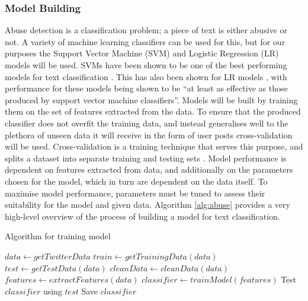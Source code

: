 \subsubsection{Model Building}
Abuse detection is a classification problem; a piece of text is either abusive or not. A variety of machine learning classifiers can be used for this, but for our purposes the Support Vector Machine (SVM) and Logistic Regression (LR) models will be used. SVMs have been shown to be one of the best performing models for text classification \cite{joachims1998text}. This has also been shown for LR models \cite{genkin2007large}, with performance for these models being shown to be ``at least as effective as those produced by support vector machine classifiers''. Models will be built by training them on the set of features extracted from the data. To ensure that the produced classifier does not overfit the training data, and instead generalises well to the plethora of unseen data it will receive in the form of user posts cross-validation will be used. Cross-validation is a training technique that serves this purpose, and splits a dataset into separate training and testing sets \cite{scikit:cross-val}. Model performance is dependent on features extracted from data, and additionally on the parameters chosen for the model, which in turn are dependent on the data itself. To maximise model performance, parameters must be tuned to assess their suitability for the model and given data. Algorithm \ref{alg:abuse} provides a very high-level overview of the process of building a model for text classification.

\begin{algorithm}
\caption{Algorithm for training model}
\label{alg:abuse}
\begin{algorithmic}[1]
\State $data\gets getTwitterData$
\State $train\gets getTrainingData(data)$
\State $test\gets getTestData(data)$
\State $cleanData\gets cleanData(data)$
\State $features\gets extractFeatures(data)$
\State $classifier\gets trainModel(features)$
\State Test $classifier$ using $test$
\State Save $classifier$
\end{algorithmic}
\end{algorithm}

